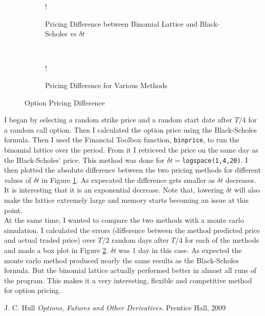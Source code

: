 \documentclass[11pt, fleqn]{article}
\begin{document}
\begin{figure}[!h]
   \centering 
   \begin{subfigure}[b]{0.45\textwidth}
     	\resizebox {\textwidth} {!} { }
		\caption{Pricing Difference between Binomial Lattice and Black-Scholes vs $\delta t$}
		\label{fig:q4-bls-vs-binomial}
    \end{subfigure}
    ~
    \begin{subfigure}[b]{0.44\textwidth}
       	\resizebox {\textwidth} {!} { }
		\caption{Pricing Difference for Various Methods}
        \label{fig:q4-bls-vs-binomial-vs-monte-error}
    \end{subfigure}
    \caption{Option Pricing Difference}
	\label{fig:pricing-difference}
\end{figure}

I began by selecting a random strike price and a random start date after $T/4$ for a random call option. Then I calculated the option price using the Black-Scholes formula. Then I used the Financial Toolbox function, \texttt{binprice}, to run the binomial lattice over the period. From it I retrieved the price on the same day as the Black-Scholes' price. This method was done for $\delta t = $\texttt{logspace(1,4,20)}. I then plotted the absolute difference between the two pricing methods for different values of $\delta t$ in Figure \ref{fig:q4-bls-vs-binomial}. As expecated the difference gets smaller as $\delta t$ decreases. It is interesting that it is an exponential decrease. Note that, lowering $\delta t$ will also make the lattice extremely large and memory starts becoming an issue at this point.\\

At the same time, I wanted to compare the two methods with a monte carlo simulation. I calculated the errors (difference between the method predicted price and actual traded price) over $T/2$ random days after $T/4$ for each of the methods and made a box plot in Figure \ref{fig:q4-bls-vs-binomial-vs-monte-error}. $\delta t$ was 1 day in this case. As expected the monte carlo method produced nearly the same results as the Black-Scholes formula. But the binomial lattice actually performed better in almost all runs of the program. This makes it a very interesting, flexible and competitive method for option pricing.








\begin{thebibliography}{9}
J. C. Hull
\textit{Options, Futures and Other Derivatives}. 
Prentice Hall, 2009

\end{thebibliography}
\end{document}
